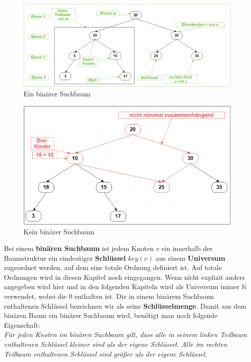 \documentclass[a4paper,12pt]{article}
\begin{document}
\begin{figure}[h]
	\centering
	\includegraphics[width= 1\textwidth]{"Medien/Einleitung/ioSuchbaum"}
	\caption{Ein binärer Suchbaum }
	\label{fig:ioSuchbaum}
\end{figure}
\begin{figure}[h]
	\centering
	\includegraphics[width= 1\textwidth]{"Medien/Einleitung/nioSuchbaum"}
	\caption{Kein binärer Suchbaum }
	\label{fig:nioSuchbaum}
\end{figure}

\noindent Bei einem \textbf{binären Suchbaum} ist jedem Knoten $v$ ein innerhalb der Baumstruktur ein eindeutiger \textbf{Schlüssel} $\mathit{key}\left(v\right)$ aus einem \textbf{Universum} zugeordnet werden, auf dem eine totale Ordnung definiert ist. Auf totale Ordnungen wird in diesen Kapitel noch eingegangen. Wenn nicht explizit anders angegeben wird hier und in den folgenden Kapiteln wird als Universum immer $\mathbb{N}$ verwendet, wobei die $0$ enthalten ist. Die in einem binärem Suchbaum enthaltenen Schlüssel bezeichnen wir als seine \textbf{Schlüsselmenge}.  Damit aus dem binären Baum ein binärer Suchbaum wird, benötigt man noch folgende Eigenschaft:\\
\textit{Für jeden Knoten im binären Suchbaum gilt, dass alle in seinem linken Teilbaum enthaltenen Schlüssel kleiner sind als der eigene Schlüssel. Alle im rechten Teilbaum enthaltenen Schlüssel sind größer als der eigene Schlüssel.} \\
\end{document}
